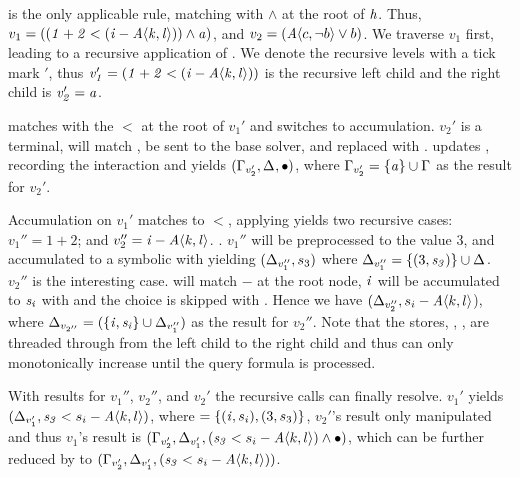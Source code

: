  is the only applicable rule, matching \boolFuncs{} with $\wedge$
at the root of $\mathit{h}$. Thus, $v_{1} = \kf{((1 + 2 < (i -
  \chc[A]{k,l})) \wedge a)}$, and $v_{2} = (\chc[A]{c,\neg b} \vee b)$. We
traverse $v_{1}$ first, leading to a recursive application of .
We denote the recursive levels with a tick mark $'$, thus \newline{} $\kf{v_{1}' = (1 + 2 <
  (i - \chc[A]{k,l}))}$ is the recursive left child and the right child is
$\mathit{v_{2}' = a}$.

 matches \inequalities{}with the $<$ at the root of $v_{1}'$ and
switches to accumulation. $v_{2}'$ is a terminal, will match , be
sent to the base solver, and replaced with \unit{}.  updates
\eStore{}, recording the interaction and yields $(\Gamma_{v_{2}'},\Delta_{},
\bullet{}{})$, where $\Gamma_{v_{2}'} = \{\mathit{a}\} \cup \Gamma_{}$ as the result for
$v_{2}'$.

Accumulation on $v_{1}'$ matches \inequalities{} to $<$, applying
 yields two recursive cases: $v_{1}'' = 1 + 2$; and $v_{2}'' =
\kf{i - \chc[A]{k,l}}$. .
%
$v_{1}''$ will be preprocessed to the value 3, and accumulated to a symbolic with
 yielding $(\Delta_{v_{1}''}, s_{3})$ where $\Delta_{v_{1}''} =
\{(3, \mathit{s_{3}})\} \cup \Delta_{}$. $v_{2}''$ is the interesting case.
 will match $-$ at the root node, $\mathit{i}$ will be accumulated
to $\mathit{s_{i}}$ with  and the choice is skipped with
. Hence we have $(\aStore{v_{2}''}, s_{i} - \chc[A]{k,l}$), where
$\Delta_{v_{2''}} = (\{\mathit{i, s_{i}}\} \cup \Delta_{v_{1}''})$ as the result for
$v_{2}''$. Note that the stores, \aStore{}, \eStore{}, are threaded through from the left
child to the right child and thus can only monotonically increase until the
query formula is processed.

With results for $v_{1}''$, $v_{2}''$, and $v_{2}'$ the recursive calls can finally
resolve. $v_{1}'$ yields $(\aStore{v_{1}'}, \kf{s_{3}} < s_{i} - \chc[A]{k,l})$,
where  $= \{(\mathit{i}, s_{i}), (3, s_{3})\}$, $v_{2}'$'s result
only manipulated \eStore{} and thus $v_{1}$'s result is $(\eStore{v_{2}'},
\aStore{v_{1}'}, (\kf{s_{3}} < s_{i} - \chc[A]{k,l}) \wedge \unit{})$, which can
be further reduced by  to \newline{} $(\eStore{v_{2}'},
\aStore{v_{1}'}, (\kf{s_{3}} < s_{i} - \chc[A]{k,l}))$.

